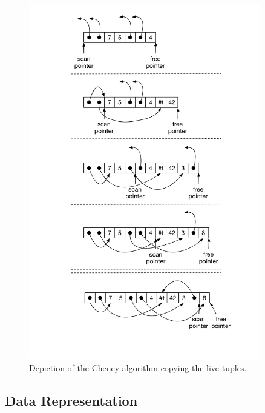 \documentclass[11pt]{book}
\begin{document}
\begin{figure}[tbp]
\centering \includegraphics[width=0.9\textwidth]{figs/cheney}
\caption{Depiction of the Cheney algorithm copying the live tuples.}
\label{fig:cheney}
\end{figure}


\subsection{Data Representation}
\label{sec:data-rep-gc}
\end{document}
